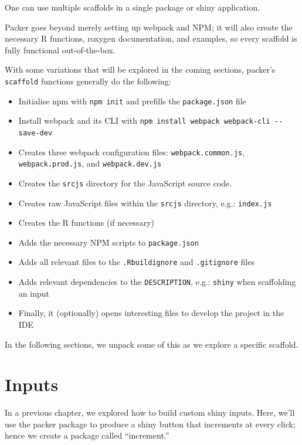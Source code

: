 \documentclass[10pt,]{krantz}
\makeatletter
\providecommand{\tightlist}{%
  \setlength{\itemsep}{0pt}\setlength{\parskip}{0pt}}
\newenvironment{kframe}{%
\medskip{}
\setlength{\fboxsep}{.8em}
 \def\at@end@of@kframe{}%
 \ifinner\ifhmode%
  \def\at@end@of@kframe{\end{minipage}}%
  \begin{minipage}{\columnwidth}%
 \fi\fi%
 \def\FrameCommand##1{\hskip\@totalleftmargin \hskip-\fboxsep
 \colorbox{shadecolor}{##1}\hskip-\fboxsep
     \hskip-\linewidth \hskip-\@totalleftmargin \hskip\columnwidth}%
 \MakeFramed {\advance\hsize-\width
   \@totalleftmargin\z@ \linewidth\hsize
   \@setminipage}}%
 {\par\unskip\endMakeFramed%
 \at@end@of@kframe}
\newenvironment{rmdblock}[1]
  {
  \begin{itemize}
  \renewcommand{\labelitemi}{
    \raisebox{-.7\height}[0pt][0pt]{
      {\setkeys{Gin}{width=3em,keepaspectratio}\texttt{[image: images/\#1]}}
    }
  }
  \setlength{\fboxsep}{1em}
  \begin{kframe}
  \item
  }
  {
  \end{kframe}
  \end{itemize}
  }
\newenvironment{rmdnote}
  {\begin{rmdblock}{note}}
  {\end{rmdblock}}
\makeatother
\begin{document}
\begin{rmdnote}
One can use multiple scaffolds in a single package or shiny application.
\end{rmdnote}

Packer goes beyond merely setting up webpack and NPM; it will also create the necessary R functions, roxygen documentation, and examples, so every scaffold is fully functional out-of-the-box.

With some variations that will be explored in the coming sections, packer's \texttt{scaffold} functions generally do the following:

\begin{itemize}
\tightlist
\item
  Initialise npm with \texttt{npm\ init} and prefills the \texttt{package.json} file
\item
  Install webpack and its CLI with \texttt{npm\ install\ webpack\ webpack-cli\ -\/-save-dev}
\item
  Creates three webpack configuration files: \texttt{webpack.common.js}, \texttt{webpack.prod.js}, and \texttt{webpack.dev.js}
\item
  Creates the \texttt{srcjs} directory for the JavaScript source code.
\item
  Creates raw JavaScript files within the \texttt{srcjs} directory, e.g.: \texttt{index.js}
\item
  Creates the R functions (if necessary)
\item
  Adds the necessary NPM scripts to \texttt{package.json}
\item
  Adds all relevant files to the \texttt{.Rbuildignore} and \texttt{.gitignore} files
\item
  Adds relevant dependencies to the \texttt{DESCRIPTION}, e.g.: \texttt{shiny} when scaffolding an input
\item
  Finally, it (optionally) opens interesting files to develop the project in the IDE
\end{itemize}

In the following sections, we unpack some of this as we explore a specific scaffold.

\hypertarget{packer-inputs}{%
\section{Inputs}\label{packer-inputs}}

In a previous chapter, we explored how to build custom shiny inputs. Here, we'll use the packer package to produce a shiny button that increments at every click; hence we create a package called ``increment.''
\end{document}
